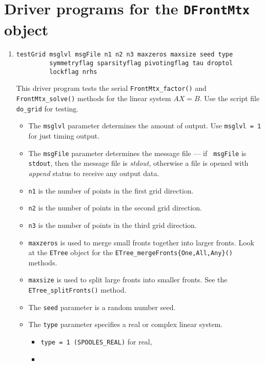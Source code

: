 \par
\section{Driver programs for the {\tt DFrontMtx} object}
\label{section:DFrontMtx:drivers}
\par
\begin{enumerate}
\item
\begin{verbatim}
testGrid msglvl msgFile n1 n2 n3 maxzeros maxsize seed type
         symmetryflag sparsityflag pivotingflag tau droptol
         lockflag nrhs 
\end{verbatim}
This driver program tests the serial {\tt FrontMtx\_factor()}
and {\tt FrontMtx\_solve()} methods for the linear system $AX = B$.
Use the script file {\tt do\_grid} for testing.
\par
\begin{itemize}
\item
The {\tt msglvl} parameter determines the amount of output.
Use {\tt msglvl = 1} for just timing output.
\item
The {\tt msgFile} parameter determines the message file --- if {\tt
msgFile} is {\tt stdout}, then the message file is {\it stdout},
otherwise a file is opened with {\it append} status to receive any
output data.
\item
{\tt n1} is the number of points in the first grid direction.
\item
{\tt n2} is the number of points in the second grid direction.
\item
{\tt n3} is the number of points in the third grid direction.
\item
{\tt maxzeros} is used to merge small fronts together into larger
fronts.
Look at the {\tt ETree} object for
the {\tt ETree\_mergeFronts\{One,All,Any\}()} methods.
\item
{\tt maxsize} is used to split large fronts into smaller
fronts.
See the {\tt ETree\_splitFronts()} method.
\item
The {\tt seed} parameter is a random number seed.
\item
The {\tt type} parameter specifies a real or complex linear system.
\begin{itemize}
\item
{\tt type = 1 (SPOOLES\_REAL)} for real,
\item

\end{itemize}
\end{itemize}
\end{enumerate}
